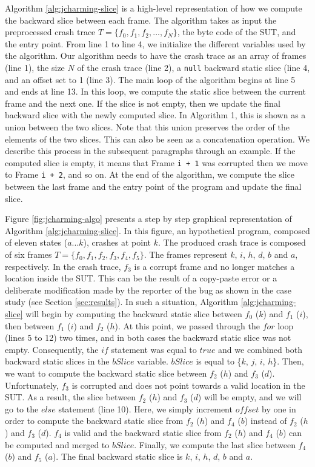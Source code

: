 \documentclass[12pt]{report}
\begin{document}
Algorithm \ref{alg:jcharming-slice} is a high-level representation of
how we compute the backward slice between each frame. The algorithm
takes as input the preprocessed crash trace
\(T=\{f_0, f_1, f_2, ..., f_N\}\), the byte code of the SUT, and the
entry point. From line 1 to line 4, we initialize the different
variables used by the algorithm. Our algorithm needs to have the crash
trace as an array of frames (line 1), the size \(N\) of the crash trace
(line 2), a \texttt{null} backward static slice (line 4, and an offset
set to 1 (line 3). The main loop of the algorithm begins at line 5 and
ends at line 13. In this loop, we compute the static slice between the
current frame and the next one. If the slice is not empty, then we
update the final backward slice with the newly computed slice. In
Algorithm 1, this is shown as a union between the two slices. Note that
this union preserves the order of the elements of the two slices. This
can also be seen as a concatenation operation. We describe this process
in the subsequent paragraphs through an example. If the computed slice
is empty, it means that Frame \lstinline!i + 1! was corrupted then we
move to Frame \lstinline!i + 2!, and so on. At the end of the algorithm,
we compute the slice between the last frame and the entry point of the
program and update the final slice.

Figure \ref{fig:jcharming-algo} presents a step by step graphical
representation of Algorithm \ref{alg:jcharming-slice}. In this figure,
an hypothetical program, composed of eleven states (\(a...k\)), crashes
at point \(k\). The produced crash trace is composed of six frames
\(T=\{f_0, f_1, f_2, f_3, f_4, f_5\}\). The frames represent \(k\),
\(i\), \(h\), \(d\), \(b\) and \(a\), respectively. In the crash trace,
\(f_3\) is a corrupt frame and no longer matches a location inside the
SUT. This can be the result of a copy-paste error or a deliberate
modification made by the reporter of the bug as shown in the case study
(see Section \ref{sec:results}). In such a situation, Algorithm
\ref{alg:jcharming-slice} will begin by computing the backward static
slice between \(f_0\) (\(k\)) and \(f_1\) (\(i\)), then between \(f_1\)
(\(i\)) and \(f_2\) (\(h\)). At this point, we passed through the
\(for\) loop (lines 5 to 12) two times, and in both cases the backward
static slice was not empty. Consequently, the \(if\) statement was equal
to \(true\) and we combined both backward static slices in the
\(bSlice\) variable. \(bSlice\) is equal to \{\(k\), \(j\), \(i\),
\(h\)\}. Then, we want to compute the backward static slice between
\(f_2\) (\(h\)) and \(f_3\) (\(d\)). Unfortunately, \(f_3\) is corrupted
and does not point towards a valid location in the SUT. As a result, the
slice between \(f_2\) (\(h\)) and \(f_3\) (\(d\)) will be empty, and we
will go to the \(else\) statement (line 10). Here, we simply increment
\(offset\) by one in order to compute the backward static slice from
\(f_2\) (\(h\)) and \(f_4\) (\(b\)) instead of \(f_2\) (\(h\)) and
\(f_3\) (\(d\)). \(f_4\) is valid and the backward static slice from
\(f_2\) (\(h\)) and \(f_4\) (\(b\)) can be computed and merged to
\(bSlice\). Finally, we compute the last slice between \(f_4\) (\(b\))
and \(f_5\) (\(a\)). The final backward static slice is \(k\), \(i\),
\(h\), \(d\), \(b\) and \(a\).
\end{document}

